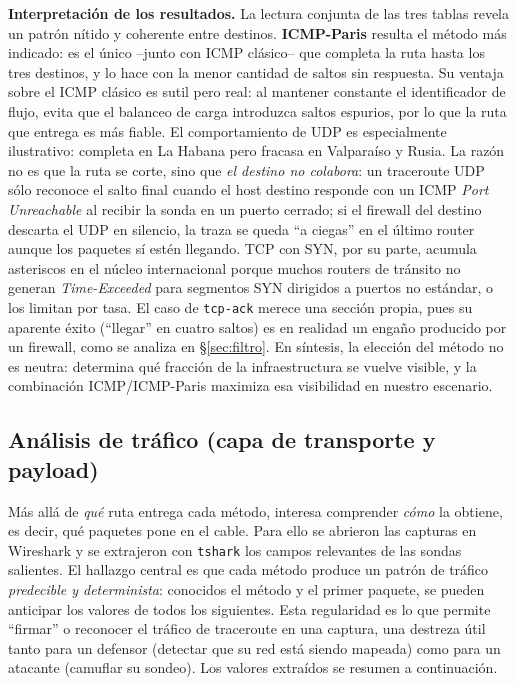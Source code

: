 \documentclass[11pt,a4paper]{article}
\begin{document}
\noindent\textbf{Interpretación de los resultados.} La lectura conjunta de las tres tablas revela
un patrón nítido y coherente entre destinos. \textbf{ICMP-Paris} resulta el método más indicado:
es el único --junto con ICMP clásico-- que completa la ruta hasta los tres destinos, y lo hace
con la menor cantidad de saltos sin respuesta. Su ventaja sobre el ICMP clásico es sutil pero
real: al mantener constante el identificador de flujo, evita que el balanceo de carga introduzca
saltos espurios, por lo que la ruta que entrega es más fiable. El comportamiento de UDP es
especialmente ilustrativo: completa en La Habana pero fracasa en Valparaíso y Rusia. La razón no
es que la ruta se corte, sino que \emph{el destino no colabora}: un traceroute UDP sólo reconoce
el salto final cuando el host destino responde con un ICMP \emph{Port Unreachable} al recibir la
sonda en un puerto cerrado; si el firewall del destino descarta el UDP en silencio, la traza se
queda ``a ciegas'' en el último router aunque los paquetes sí estén llegando. TCP con SYN, por su
parte, acumula asteriscos en el núcleo internacional porque muchos routers de tránsito no generan
\emph{Time-Exceeded} para segmentos SYN dirigidos a puertos no estándar, o los limitan por tasa.
El caso de \texttt{tcp-ack} merece una sección propia, pues su aparente éxito (``llegar'' en
cuatro saltos) es en realidad un engaño producido por un firewall, como se analiza en
§\ref{sec:filtro}. En síntesis, la elección del método no es neutra: determina qué fracción de la
infraestructura se vuelve visible, y la combinación ICMP/ICMP-Paris maximiza esa visibilidad en
nuestro escenario.

\subsection{Análisis de tráfico (capa de transporte y payload)}
Más allá de \emph{qué} ruta entrega cada método, interesa comprender \emph{cómo} la obtiene, es
decir, qué paquetes pone en el cable. Para ello se abrieron las capturas en Wireshark y se
extrajeron con \texttt{tshark} los campos relevantes de las sondas salientes. El hallazgo central
es que cada método produce un patrón de tráfico \emph{predecible y determinista}: conocidos el
método y el primer paquete, se pueden anticipar los valores de todos los siguientes. Esta
regularidad es lo que permite ``firmar'' o reconocer el tráfico de traceroute en una captura, una
destreza útil tanto para un defensor (detectar que su red está siendo mapeada) como para un
atacante (camuflar su sondeo). Los valores extraídos se resumen a continuación.
\end{document}
